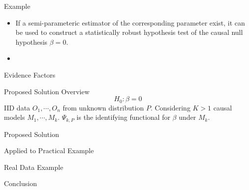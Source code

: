 \documentclass{beamer}
\begin{document}
\begin{frame}{Example}
	\begin{itemize}
		\item If a semi-parameteric estimator of the corresponding parameter exist, it can be used to construct a statistically robust hypothesis test of the causal null hypothesis $ \beta = 0 $.
		\item 
	\end{itemize}
\end{frame}

\begin{frame}{Evidence Factors}
\end{frame}

\begin{frame}{Proposed Solution Overview}
	$$ H_{0}: \beta = 0 $$
	IID data $ O_1, \cdots, O_n $ from unknown distribution $ P $.
	Considering $ K > 1 $ causal models $ M_1, \cdots, M_k $.
	$ \Psi_{k, P} $ is the identifying functional for $ \beta $ under $ M_k $.
\end{frame}

\begin{frame}{Proposed Solution}
\end{frame}

\begin{frame}{Applied to Practical Example}
\end{frame}

\begin{frame}{Real Data Example}
\end{frame}

\begin{frame}{Conclusion}
\end{frame}
\end{document}
